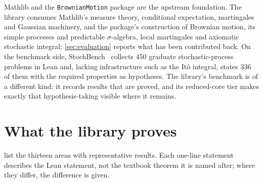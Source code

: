\documentclass[11pt]{article}
\begin{document}
Mathlib and the \texttt{BrownianMotion} package are the upstream foundation. The library consumes Mathlib's measure
theory, conditional expectation, martingales and Gaussian machinery, and the package's construction of Brownian
motion, its simple processes and predictable $\sigma$-algebra, local martingales and axiomatic stochastic integral;
\cref{sec:evaluation} reports what has been contributed back. On the benchmark side, StochBench~\cite{StochBench2026}
collects 450 graduate stochastic-process problems in Lean and, lacking infrastructure such as the It\^o integral,
states 336 of them with the required properties as hypotheses. The library's benchmark is of a different kind: it
records results that are proved, and its reduced-core tier makes exactly that hypothesis-taking visible where it
remains.

\section{What the library proves}\label{sec:breadth}

 list the thirteen areas with representative results. Each one-line statement describes the Lean
statement, not the textbook theorem it is named after; where they differ, the difference is given.
\end{document}
